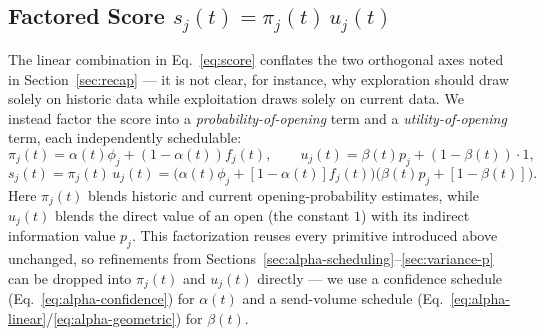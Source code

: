 \subsection{Factored Score $s_j(t) = \pi_j(t)\,u_j(t)$}
\label{sec:factored-score}

The linear combination in Eq.~\eqref{eq:score} conflates the two
orthogonal axes noted in Section~\ref{sec:recap} --- it is not clear, for
instance, why exploration should draw solely on historic data while
exploitation draws solely on current data. We instead factor the score
into a \emph{probability-of-opening} term and a \emph{utility-of-opening}
term, each independently schedulable:
\begin{equation}
\label{eq:pi-u}
\pi_j(t) = \alpha(t)\phi_j + (1-\alpha(t))f_j(t),
\qquad
u_j(t) = \beta(t)p_j + (1-\beta(t))\cdot 1,
\end{equation}
\begin{equation}
\label{eq:s-factored}
s_j(t) = \pi_j(t)\,u_j(t)
       = \Big(\alpha(t)\phi_j + [1-\alpha(t)]f_j(t)\Big)
         \Big(\beta(t)p_j + [1-\beta(t)]\Big).
\end{equation}
Here $\pi_j(t)$ blends historic and current opening-probability estimates,
while $u_j(t)$ blends the direct value of an open (the constant $1$) with
its indirect information value $p_j$. This factorization reuses every
primitive introduced above unchanged, so refinements from
Sections~\ref{sec:alpha-scheduling}--\ref{sec:variance-p} can be dropped
into $\pi_j(t)$ and $u_j(t)$ directly --- we use a confidence schedule
(Eq.~\eqref{eq:alpha-confidence}) for $\alpha(t)$ and a send-volume
schedule (Eq.~\eqref{eq:alpha-linear}/\eqref{eq:alpha-geometric}) for
$\beta(t)$.
